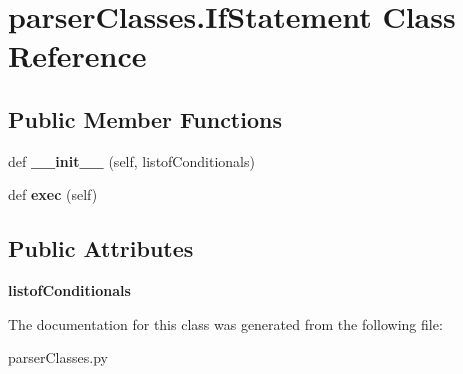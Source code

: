 \hypertarget{classparser_classes_1_1_if_statement}{}\section{parser\+Classes.\+If\+Statement Class Reference}
\label{classparser_classes_1_1_if_statement}
\subsection*{Public Member Functions}
\begin{DoxyCompactItemize}
\item 
def {\bfseries \+\_\+\+\_\+init\+\_\+\+\_\+} (self, listof\+Conditionals)\hypertarget{classparser_classes_1_1_if_statement_a53d538b0688ee1556bcda14383ff7a1c}{}\label{classparser_classes_1_1_if_statement_a53d538b0688ee1556bcda14383ff7a1c}

\item 
def {\bfseries exec} (self)\hypertarget{classparser_classes_1_1_if_statement_a53a8b4b35816147f44d1d1e568f60528}{}\label{classparser_classes_1_1_if_statement_a53a8b4b35816147f44d1d1e568f60528}

\end{DoxyCompactItemize}
\subsection*{Public Attributes}
\begin{DoxyCompactItemize}
\item 
{\bfseries listof\+Conditionals}\hypertarget{classparser_classes_1_1_if_statement_a9d440106c71d7c46441ad74cf7142a25}{}\label{classparser_classes_1_1_if_statement_a9d440106c71d7c46441ad74cf7142a25}

\end{DoxyCompactItemize}


The documentation for this class was generated from the following file\+:\begin{DoxyCompactItemize}
\item 
parser\+Classes.\+py\end{DoxyCompactItemize}
